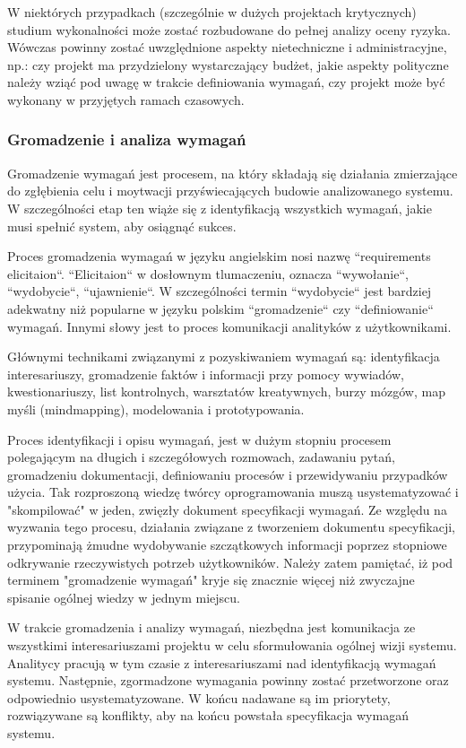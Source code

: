         W niektórych przypadkach (szczególnie w dużych projektach krytycznych) studium wykonalności może zostać rozbudowane do pełnej analizy oceny ryzyka. Wówczas powinny zostać uwzględnione aspekty nietechniczne i administracyjne, np.: czy projekt ma przydzielony wystarczający budżet, jakie aspekty polityczne należy wziąć pod uwagę w trakcie definiowania wymagań, czy projekt może być wykonany w przyjętych ramach czasowych.

      \subsubsection{Gromadzenie i analiza wymagań}

        Gromadzenie wymagań jest procesem, na który składają się działania zmierzające do zgłębienia celu i moytwacji przyświecających budowie analizowanego systemu. W szczególności etap ten wiąże się z identyfikacją wszystkich wymagań, jakie musi spełnić system, aby osiągnąć sukces.
        
        Proces gromadzenia wymagań w języku angielskim nosi nazwę ``requirements elicitaion``. ``Elicitaion`` w dosłownym tlumaczeniu, oznacza ``wywołanie``, ``wydobycie``, ``ujawnienie``. W szczególności termin ``wydobycie`` jest bardziej adekwatny niż popularne w języku polskim ``gromadzenie`` czy ``definiowanie`` wymagań. Innymi słowy jest to proces komunikacji analityków z użytkownikami. 

        Głównymi technikami związanymi z pozyskiwaniem wymagań są: identyfikacja interesariuszy, gromadzenie faktów i informacji przy pomocy wywiadów, kwestionariuszy, list kontrolnych, warsztatów kreatywnych, burzy mózgów, map myśli (mindmapping), modelowania i prototypowania.
        
        Proces identyfikacji i opisu wymagań, jest w dużym stopniu procesem polegającym na długich i szczegółowych rozmowach, zadawaniu pytań, gromadzeniu dokumentacji, definiowaniu procesów i przewidywaniu przypadków użycia. Tak rozproszoną wiedzę twórcy oprogramowania muszą usystematyzować i "skompilować" w jeden, zwięzły dokument specyfikacji wymagań. Ze względu na wyzwania tego procesu, działania związane z tworzeniem dokumentu specyfikacji, przypominają żmudne wydobywanie szczątkowych informacji poprzez stopniowe odkrywanie rzeczywistych potrzeb użytkowników. Należy zatem pamiętać, iż pod terminem "gromadzenie wymagań" kryje się znacznie więcej niż zwyczajne spisanie ogólnej wiedzy w jednym miejscu.  

        W trakcie gromadzenia i analizy wymagań, niezbędna jest komunikacja ze wszystkimi interesariuszami projektu w celu sformułowania ogólnej wizji systemu. Analitycy pracują w tym czasie z interesariuszami nad identyfikacją wymagań systemu. Następnie, zgormadzone wymagania powinny zostać przetworzone oraz odpowiednio usystematyzowane. W końcu nadawane są im priorytety, rozwiązywane są konflikty, aby na końcu powstała specyfikacja wymagań systemu.

